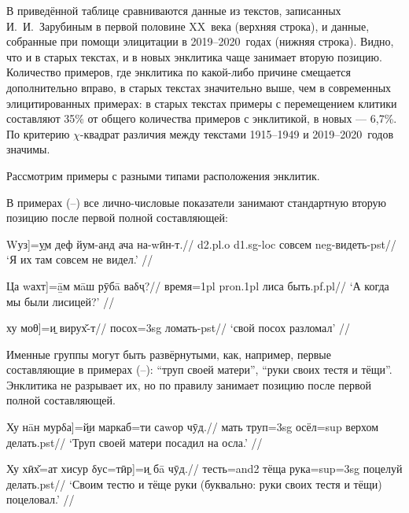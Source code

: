 В приведённой таблице сравниваются данные из текстов, записанных И.~И.~Зарубиным в первой половине XX~века (верхняя строка), и данные, собранные при помощи элицитации в 2019–2020~годах (нижняя строка). Видно, что и в старых текстах, и в новых энклитика чаще занимает вторую позицию. Количество примеров, где энклитика по какой-либо причине смещается дополнительно вправо, в старых текстах значительно выше, чем в современных элицитированных примерах: в старых текстах примеры с перемещением клитики составляют 35\% от общего количества примеров с энклитикой, в новых — 6,7\%. По критерию ${\chi}$-квадрат различия между текстами 1915–1949 и 2019–2020~годов значимы.

Рассмотрим примеры с разными типами расположения энклитик.

В примерах (–) все лично-числовые показатели занимают стандартную вторую позицию после первой полной составляющей:

\begingl
\gla {[}Wуз{]}=\b{ум} деф йум-анд ача на-wӣн-т.//
 {\sc d2.pl.o} {\sc d1.sg-loc} совсем {\sc neg}-видеть-{\sc pst}//
\glft ‘Я их там совсем не видел.’ //
\endgl \xe

\begingl
\gla {[}Ца wахт{]}=\b{āм} мāш рӯбā ваδҷ?//
 время={\sc 1pl} {\sc pron.1pl} лиса быть.{\sc pf.pl}//
\glft ‘А когда мы были лисицей?’ //
\endgl \xe

\begingl
\gla {[}ху моθ{]}=\b{и} вирух̌-т//
 посох={\sc 3sg} ломать-{\sc pst}//
\glft ‘свой посох разломал’ //
\endgl \xe

Именные группы могут быть развёрнутыми, как, например, первые составляющие в примерах (–): “труп своей матери”, “руки своих тестя и тёщи”. Энклитика не разрывает их, но по правилу занимает позицию после первой полной составляющей.

\begingl
\gla {[}Ху нāн мурδа{]}=\b{йи} маркаб=ти саwор чӯд.//
 мать труп={\sc 3sg} осёл={\sc sup} верхом делать.{\sc pst}//
\glft ‘Труп своей матери посадил на осла.’ //
\endgl \xe

\begingl
\gla {[}Ху хӣх̌=ат хисур δус=тӣр{]}=\b{и} бā чӯд.//
 тесть={\sc and2} тёща рука={\sc sup=3sg} поцелуй делать.{\sc pst}//
\glft ‘Своим тестю и тёще руки (буквально: руки своих тестя и тёщи) поцеловал.’ //
\endgl \xe

